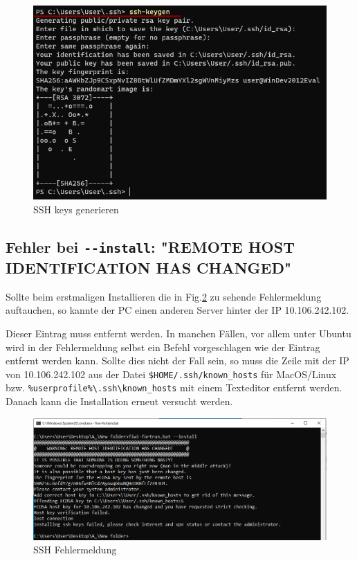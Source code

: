 \documentclass[11pt, a4paper]{article}
\begin{document}
\begin{figure}[h]
    \centering
    \includegraphics[width=0.7\linewidth]{./pics/2022-03-09_00-17.png}
    \caption{SSH keys generieren}
    \label{fig:ssh}
\end{figure}


\subsection{Fehler bei \texttt{-{}-install}: "REMOTE HOST IDENTIFICATION HAS CHANGED"}\label{sec:ssh}
Sollte beim erstmaligen Installieren die in Fig.\ref{fig:ssh-host-key} zu sehende Fehlermeldung auftauchen, so kannte der PC einen anderen Server hinter der IP 10.106.242.102.

Dieser Eintrag muss entfernt werden. In manchen Fällen, vor allem unter Ubuntu wird in der Fehlermeldung selbst ein Befehl vorgeschlagen wie der Eintrag entfernt werden kann.
Sollte dies nicht der Fall sein, so muss die Zeile mit der IP von 10.106.242.102 aus der Datei \texttt{\$HOME/.ssh/known\_hosts} für MacOS/Linux bzw. \texttt{\%userprofile\%\textbackslash.ssh\textbackslash{}known\_hosts} mit einem Texteditor entfernt werden.
Danach kann die Installation erneut versucht werden.

\begin{figure}[h]
    \centering
    \includegraphics[width=0.9\linewidth]{./pics/2022-03-16_16-04.png}
    \caption{SSH Fehlermeldung}
    \label{fig:ssh-host-key}
\end{figure}
\end{document}
